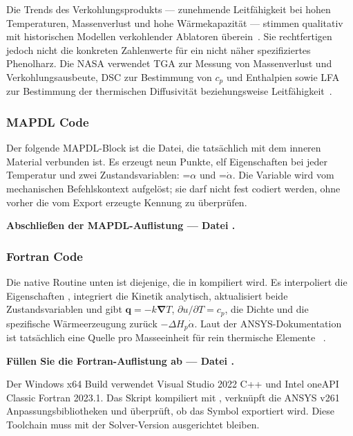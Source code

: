 \documentclass[oneside,openany]{amsdtx}
\newcommand{\pd}{\partial}
\newcommand{\vect}[1]{\bm{#1}}
\begin{document}
Die Trends des Verkohlungsprodukts --- zunehmende Leitfähigkeit bei hohen Temperaturen, Massenverlust und hohe Wärmekapazität --- stimmen qualitativ mit historischen Modellen verkohlender Ablatoren überein~\cite{clark1972,ewing2013}. Sie rechtfertigen jedoch nicht die konkreten Zahlenwerte für ein nicht näher spezifiziertes Phenolharz. Die NASA verwendet TGA zur Messung von Massenverlust und Verkohlungsausbeute, DSC zur Bestimmung von \(c_p\) und Enthalpien sowie LFA zur Bestimmung der thermischen Diffusivität beziehungsweise Leitfähigkeit~\cite{nasa-testing}.

\subsubsection{MAPDL Code}
\label{sec:apdl-code}

Der folgende MAPDL-Block ist die Datei, die tatsächlich mit dem inneren Material verbunden ist. Es erzeugt neun  Punkte, elf Eigenschaften bei jeder Temperatur und zwei Zustandsvariablen: =\(\alpha\) und =\(\dot\alpha\). Die Variable  wird vom mechanischen Befehlskontext aufgelöst; sie darf nicht fest codiert werden, ohne vorher die vom Export erzeugte Kennung zu überprüfen.

\medskip \noindent\textbf{Abschließen der MAPDL-Auflistung --- Datei .}


\subsubsection{Fortran  Code}

Die native Routine unten ist diejenige, die in  kompiliert wird. Es interpoliert die Eigenschaften , integriert die Kinetik analytisch, aktualisiert beide Zustandsvariablen und gibt \(\vect q=-k\vect\nabla T\), \(\pd u/\pd T=c_p\), die Dichte und die spezifische Wärmeerzeugung zurück \(-\Delta H_p\dot\alpha\). Laut der ANSYS-Dokumentation ist  tatsächlich eine Quelle pro Masseeinheit für rein thermische Elemente ~\cite{ansys-usermatth}.

\medskip \noindent\textbf{Füllen Sie die Fortran-Auflistung ab --- Datei .}


Der Windows x64 Build verwendet Visual Studio 2022 C++ und Intel oneAPI Classic Fortran 2023.1. Das Skript  kompiliert mit , verknüpft die ANSYS v261 Anpassungsbibliotheken und überprüft, ob das Symbol  exportiert wird. Diese Toolchain muss mit der Solver-Version ausgerichtet bleiben.
\end{document}
